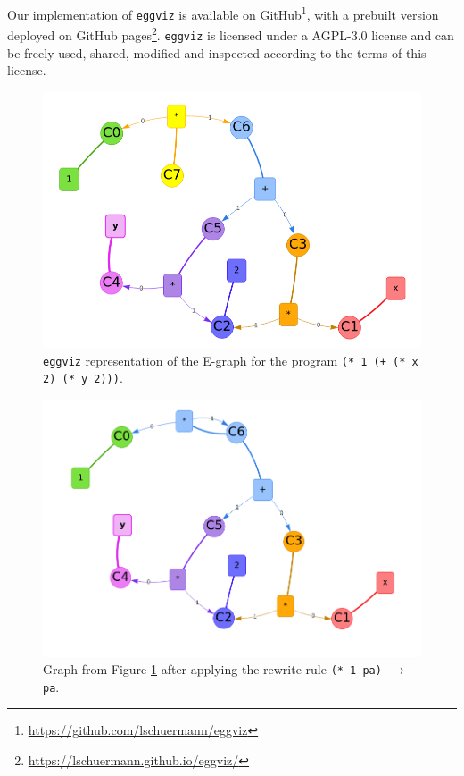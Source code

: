 \documentclass[letterpaper,twocolumn,11pt]{article}
\begin{document}
Our implementation of \texttt{eggviz} is available on
GitHub\footnote{\url{https://github.com/lschuermann/eggviz}}, with a prebuilt
version deployed on GitHub
pages\footnote{\url{https://lschuermann.github.io/eggviz/}}. \texttt{eggviz} is
licensed under a AGPL-3.0 license and can be freely used, shared, modified and
inspected according to the terms of this license.




\begin{figure}
    \centering
    \includegraphics[width=1.2\columnwidth]{before.png}
    \caption{\texttt{eggviz} representation of the E-graph for the program
      \texttt{(* 1 (+ (* x 2) (* y 2)))}.}
    \label{fig:before}
\end{figure}

\begin{figure}
    \centering
    \includegraphics[width=1.2\columnwidth]{after-1.png}
    \caption{Graph from Figure \ref{fig:before} after applying the rewrite rule
      \texttt{(* 1 pa) $\rightarrow$ pa}. }
    \label{fig:after_1}
\end{figure}
\end{document}
